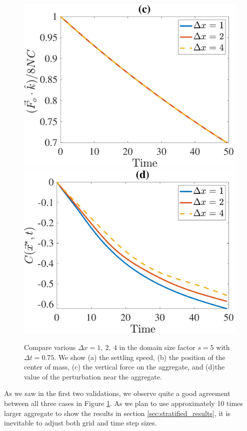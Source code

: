 \begin{figure}[ht]
\begin{center}
		\includegraphics[scale=0.35]{./figures/fig_NC10_dx_Fo3_all}
		\includegraphics[scale=0.35]{./figures/fig_NC10_dx_C_star}
	\caption{Compare various $\Delta x = 1, \ 2, \ 4$ in the domain size factor $s = 5$ with $\Delta t = 0.75$. We show (a) the settling speed, (b) the position of the center of mass, (c) the vertical force on the aggregate, and (d)the value of the perturbation near the aggregate.}
	\label{fig_NC10_compare_dx}
\end{center}
\end{figure}
As we saw in the first two validations, we observe quite a good agreement between all three cases in Figure \ref{fig_NC10_compare_dx}. As we plan to use approximately 10 times larger aggregate to show the results in section \ref{sec:stratified_results}, it is inevitable to adjust both grid and time step sizes. 
